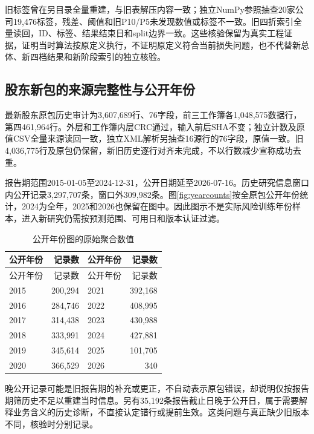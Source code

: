 旧标签曾在另目录全量重建，与旧表解压内容一致；独立NumPy参照抽查20家公司19,476标签，残差、阈值和旧P10/P5未发现数值或标签不一致。旧四折索引全量读回，ID、标签、结果结束日和split边界一致。这些核验保留为真实工程证据，证明当时算法按原定义执行，不证明原定义符合当前损失问题，也不代替新总体、新四档结果和新阶段索引的独立核验。

\subsection{股东新包的来源完整性与公开年份}
最新股东原包历史审计为3,607,689行、76字段，前三工作簿各1,048,575数据行，第四461,964行。外层和工作簿内层CRC通过，输入前后SHA不变；独立计数及原值CSV全量来源读回一致，独立XML解析另抽查16源行的76字段，原值一致。旧4,036,775行及原包仍保留，新旧历史逐行对齐未完成，不以行数减少宣称成功去重。

报告期范围2015-01-05至2024-12-31，公开日期延至2026-07-16。历史研究信息窗口内公开记录3,297,707条，窗口外309,982条。图\ref{fig:yearcounts}按全原包公开年份统计，2024为全年，2025和2026也保留在图中。因此图示不是实际风险训练年份样本，进入新研究仍需按预测范围、可用日和版本认证过滤。


\begingroup\small
\begin{longtable}{p{2.4cm}r p{2.4cm}r}
\caption{公开年份图的原始聚合数值}\label{tab:yearcounts}\\
\toprule 公开年份&记录数&公开年份&记录数\\\midrule\endfirsthead
\toprule 公开年份&记录数&公开年份&记录数\\\midrule\endhead
2015&200,294&2021&392,168\\
2016&284,746&2022&408,995\\
2017&314,438&2023&430,988\\
2018&333,991&2024&427,881\\
2019&345,614&2025&101,705\\
2020&366,529&2026&340\\\bottomrule
\end{longtable}
\endgroup

晚公开记录可能是旧报告期的补充或更正，不自动表示原包错误，却说明仅按报告期筛历史不足以重建当时信息。另有35,192条报告截止日晚于公开日，属于需要解释业务含义的历史诊断，不直接认定错行或提前生效。这类问题与真正缺少旧版本不同，核验时分别记录。

